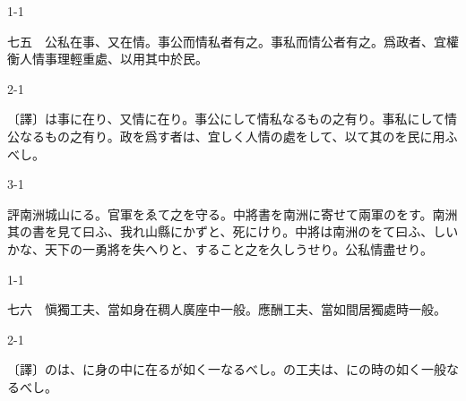 \documentclass[tate,paper=b6j,jafontsize=9pt]{jlreq}
\begin{document}
\begin{azconvIndented}{1\zw}{-1\zw}

七五　公私在事、又在情。事公而情私者有之。事私而情公者有之。爲政者、宜權衡人情事理輕重處、以用其中於\azconvKunten{\azconvJR}民。

\end{azconvIndented}
\begin{azconvIndented}{2\zw}{-1\zw}

〔譯〕は事に在り、又情に在り。事公にして情私なるもの之有り。事私にして情公なるもの之有り。政を爲す者は、宜しく人情の處をして、以て其のを民に用ふべし。

\end{azconvIndented}
\begin{azconvIndented}{3\zw}{-1\zw}

評南洲城山にる。官軍をゑて之を守る。中將書を南洲に寄せて兩軍のをす。南洲其の書を見て曰ふ、我れ山縣にかずと、死にけり。中將は南洲のをて曰ふ、しいかな、天下の一勇將を失へりと、すること之を久しうせり。公私情盡せり。

\end{azconvIndented}

\begin{azconvIndented}{1\zw}{-1\zw}

七六　愼獨工夫、當如身在稠人廣座中一般。應酬工夫、當如間居獨處時一般。

\end{azconvIndented}
\begin{azconvIndented}{2\zw}{-1\zw}

〔譯〕のは、に身の中に在るが如く一なるべし。の工夫は、にの時の如く一般なるべし。

\end{azconvIndented}
\end{document}
